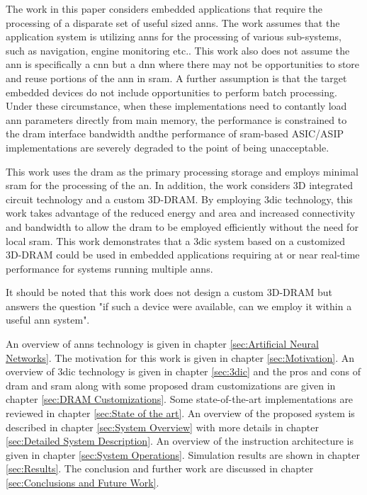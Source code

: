 The work in this paper considers embedded applications that require the processing of a disparate set of useful sized \ac{ann}s. The work assumes that the application system is utilizing \ac{ann}s
for the processing of various sub-systems, such as navigation, engine monitoring etc.. This work also does not assume the \ac{ann} is specifically a \ac{cnn} but a \ac{dnn} where there may
not be opportunities to store and reuse portions of the \ac{ann} in \ac{sram}. A further assumption is that the target embedded devices do not include opportunities to perform batch processing.
Under these circumstance, when these implementations need to contantly load \ac{ann} parameters directly from main memory, the performance is constrained to the \ac{dram} interface bandwidth andthe performance of \ac{sram}-based ASIC/ASIP implementations are severely degraded to the point of being unacceptable.

This work uses the \ac{dram} as the primary processing storage and employs minimal \ac{sram} for the processing of the \ac{an}.
In addition, the work considers 3D integrated circuit technology and a custom 3D-DRAM. By employing \ac{3dic} technology, this work takes advantage of the reduced energy and area and increased
connectivity and bandwidth to allow the \ac{dram} to be employed efficiently without the need for local \ac{sram}.
This work demonstrates that a \ac{3dic} system based on a customized 3D-DRAM could be used in embedded applications requiring at or near real-time performance for systems running multiple \ac{ann}s.

It should be noted that this work does not design a custom 3D-DRAM but answers the question "if such a device were available, can we employ it within a useful \ac{ann} system".

\hfill %

An overview of \acp{ann} technology is given in chapter \ref{sec:Artificial Neural Networks}.
The motivation for this work is given in chapter \ref{sec:Motivation}.
An overview of \ac{3dic} technology is given in chapter \ref{sec:3dic} and the pros and cons of \ac{dram} and \ac{sram} along with some proposed \ac{dram} customizations are given in chapter \ref{sec:DRAM Customizations}.
Some state-of-the-art implementations are reviewed in chapter \ref{sec:State of the art}.
An overview of the proposed system is described in chapter \ref{sec:System Overview} with more details in chapter \ref{sec:Detailed System Description}.
An overview of the instruction architecture is given in chapter \ref{sec:System Operations}.
Simulation results are shown in chapter \ref{sec:Results}.
The conclusion and further work are discussed in chapter \ref{sec:Conclusions and Future Work}.


